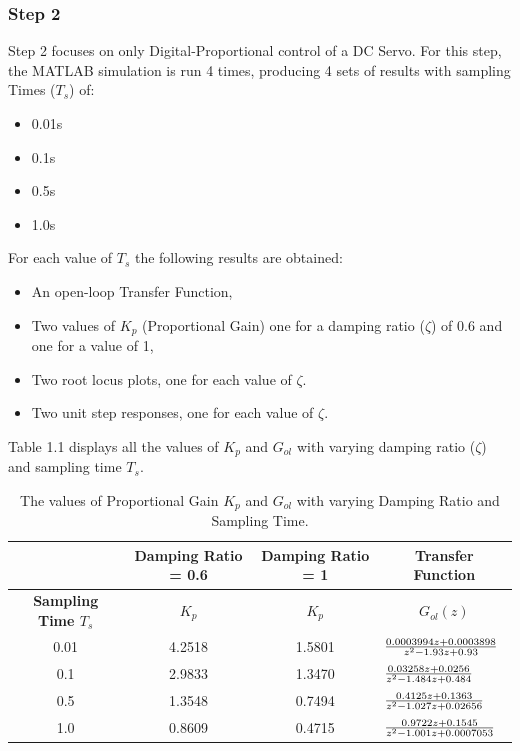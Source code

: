 \documentclass[stu, a4paper, 12pt, floatsintext]{apa7}
\numberwithin{figure}{section}
\numberwithin{table}{section}
\numberwithin{equation}{section}
\begin{document}
\subsubsection{Step 2}
Step 2 focuses on only Digital-Proportional control of a DC Servo. For this step, the MATLAB simulation is run 4 times, producing 4 sets of results with sampling Times ($T_s$) of:
\begin{itemize}
    \item 0.01s
    \item 0.1s
    \item 0.5s
    \item 1.0s 
\end{itemize}
For each value of $T_s$ the following results are obtained:
\begin{itemize}
    \item An open-loop Transfer Function,
    \item Two values of $K_p$ (Proportional Gain) one for a damping ratio ($\zeta$) of 0.6 and one for a value of 1,
    \item Two root locus plots, one for each value of $\zeta$. 
    \item Two unit step responses, one for each value of $\zeta$. 
\end{itemize}
Table 1.1 displays all the values of $K_p$ and $G_{ol}$ with varying damping ratio ($\zeta$) and sampling time $T_s$. 
\begin{table}[H]
    \centering
    \caption{The values of Proportional Gain $K_p$ and $G_{ol}$ with varying Damping Ratio and Sampling Time.}
    \label{tab:task2_gain_table}
    \begin{tabular}{@{}cccl@{}}
    \toprule
    \multicolumn{1}{l}{}         & \textbf{Damping Ratio = 0.6} & \textbf{Damping Ratio = 1} & \multicolumn{1}{c}{\textbf{Transfer Function}}                    \\ \midrule
    \textbf{Sampling Time $T_s$} & $K_p$                        & $K_p$                      & \multicolumn{1}{c}{$G_{ol}(z)$}                                      \\
    0.01                         & 4.2518                       & 1.5801                     & ${{0.0003994 z + 0.0003898}\over{z^2-1.93z+0.93}}$      \\
    0.1                          & 2.9833                       & 1.3470                     & ${{0.03258 z + 0.0256}\over{z^2 - 1.484 z + 0.484}}$    \\
    0.5                          & 1.3548                       & 0.7494                     & ${{0.4125 z + 0.1363}\over{z^2 - 1.027 z + 0.02656}}$   \\
    1.0                          & 0.8609                       & 0.4715                     & ${{0.9722 z + 0.1545}\over{z^2 - 1.001 z + 0.0007053}}$ \\ \bottomrule
\end{tabular}
\end{table}
\end{document}
